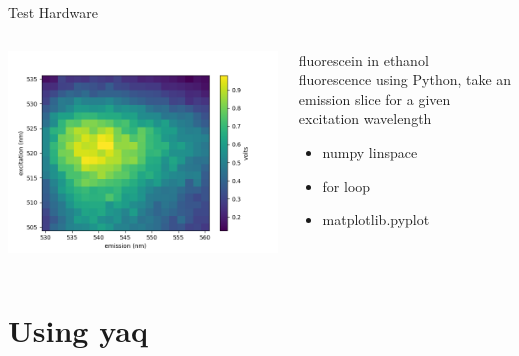 \documentclass{presentation}
\begin{document}
\begin{frame}{Test Hardware}
  \begin{columns}
    \begin{column}{0.6\textwidth}
      \includegraphics[width=\textwidth]{./2d-pl.png}
    \end{column}
    \begin{column}{0.4\textwidth}
      fluorescein in ethanol \\
      fluorescence
      \vfill
      using Python, take an emission slice for a given excitation wavelength
      \begin{itemize}
        \item{numpy linspace}
        \item{for loop}
        \item{matplotlib.pyplot}
      \end{itemize}
    \end{column}
  \end{columns}
\end{frame}

\section{Using yaq}
\end{document}
